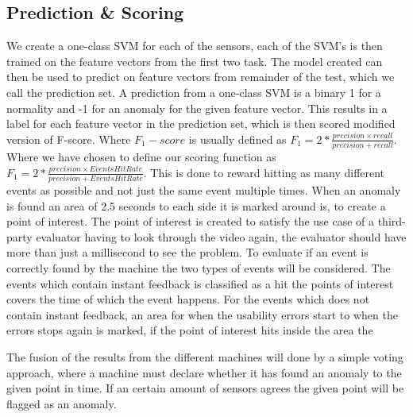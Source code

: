 \subsection{Prediction \& Scoring}
We create a one-class SVM for each of the sensors, each of the SVM's is then trained on the feature vectors from the first two task. The model created can then be used to predict on feature vectors from remainder of the test, which we call the prediction set.
A prediction from a one-class SVM is a binary 1 for a normality and -1 for an anomaly for the given feature vector.
This results in a label for each feature vector in the prediction set, which is then scored modified version of F-score.
Where $F_1-score$ is usually defined as $F_1 = 2 * \frac{precision \times recall}{precision + recall}$. Where we have chosen to define our scoring function as $F_1 = 2 * \frac{precision \times EventsHitRate}{precision + EventsHitRate}$. This is done to reward hitting as many different events as possible and not just the same event multiple times.
When an anomaly is found an area of 2.5 seconds to each side it is marked around is, to create a point of interest. The point of interest is created to satisfy the use case of a third-party evaluator having to look through the video again, the evaluator should have more than just a millisecond to see the problem. 
To evaluate if an event is correctly found by the machine the two types of events will be considered.
The events which contain instant feedback is classified as a hit the points of interest covers the time of which the event happens.
For the events which does not contain instant feedback, an area for when the usability errors start to when the errors stops again is marked, if the point of interest hits inside the area the 

The fusion of the results from the different machines will done by a simple voting approach, where a machine must declare whether it has found an anomaly to the given point in time. If an certain amount of sensors agrees the given point will be flagged as an anomaly. 




